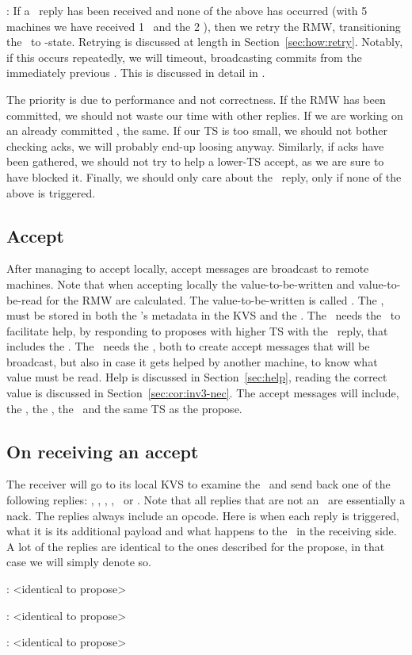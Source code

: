 \item \loghigh: If a \loghigh~reply has been received and none of the above has occurred (\eg with 5 machines we have received 1 \loghigh~and the 2 \acks), then we retry the RMW, transitioning the \locentry~to \retry-state. Retrying is discussed at length in Section~\ref{sec:how:retry}. Notably, if this occurs repeatedly, we will timeout, broadcasting commits from the immediately previous \logno. This is discussed in detail in  .

\squishend

\custvspace{}
The priority is due to performance and not correctness.
If the RMW has been committed, we should not waste our time with other replies.
If we are working on an already committed \logno, the same.
If our TS is too small, we should not bother checking acks, we will probably end-up loosing anyway. Similarly, if acks have been gathered, we should not try to help a lower-TS accept, as we are sure to have blocked it. Finally, we should only care about the \loghigh~reply, only if none of the above is triggered.



\subsection{Accept}
After managing to accept locally, accept messages are broadcast to remote machines.
Note that when accepting locally the value-to-be-written and value-to-be-read for the RMW are calculated. The value-to-be-written is called \accval. The \accval, must be stored in both the \kv's metadata in the KVS and the \locentry. 
The \kv~needs the \accval~to facilitate help, by responding to proposes with higher TS with the \lowacc~reply, that includes the \accval. The \locentry~needs the \accval, both to create accept messages that will be broadcast, but also in case it gets helped by another machine, to know what value must be read. Help is discussed in Section~\ref{sec:help}, reading the correct value is discussed in Section~\ref{sec:cor:inv3-nec}.
The accept messages will include, the \accval, the \logno, the \rmw~and the same TS as the propose.



\subsection{On receiving an accept} \label{sec:prot:acc-recv}
The receiver will go to its local KVS to examine the \kv~and send back one of the following replies:
\alreadycom, \loglow, \loghigh, \highprop, \highacc~or \ack.
Note that all replies that are not an \ack~are essentially a nack.
The replies always include an opcode.
Here is when each reply is triggered, what it is its additional payload and what happens to the \kv~in the receiving side. A lot of the replies are identical to the ones described for the propose, in that case we will simply denote so.
\squishlist
\item \alreadycom: <identical to propose>
\item \loglow: <identical to propose>
\item \loghigh: <identical to propose>

